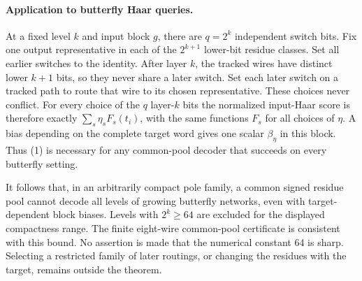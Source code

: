 \documentclass[11pt]{article}
\begin{document}
\paragraph{Application to butterfly Haar queries.}
At a fixed level $k$ and input block $g$, there are $q=2^k$
independent switch bits. Fix one output representative in each of the
$2^{k+1}$ lower-bit residue classes. Set all earlier switches to the
identity. After layer $k$, the tracked wires have distinct lower
$k+1$ bits, so they never share a later switch. Set each later switch
on a tracked path to route that wire to its chosen representative.
These choices never conflict. For every choice of the $q$ layer-$k$
bits the normalized input-Haar score is therefore exactly
$\sum_s\eta_s F_s(t_i)$, with the same functions $F_s$ for all
choices of $\eta$. A bias depending on the complete target word gives
one scalar $\beta_\eta$ in this block. Thus (1) is necessary for any
common-pool decoder that succeeds on every butterfly setting.

It follows that, in an arbitrarily compact pole family, a common signed
residue pool cannot decode all levels of growing butterfly networks,
even with target-dependent block biases. Levels with $2^k\geq64$ are
excluded for the displayed compactness range. The finite eight-wire
common-pool certificate is consistent with this bound. No assertion is
made that the numerical constant 64 is sharp. Selecting a restricted
family of later routings, or changing the residues with the target,
remains outside the theorem.
\end{document}
